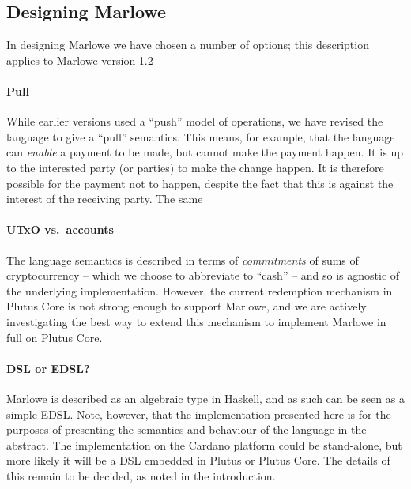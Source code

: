 \documentclass[
      acmsmall
    , screen
    , review=true
  ]{acmart}
\begin{document}
\subsection{Designing Marlowe}

In designing Marlowe we have chosen a number of options; this description applies to Marlowe version 1.2 

\paragraph{Pull} 

While earlier versions used a ``push'' model of operations, we have revised the language to give a ``pull'' semantics. This means, for example, that the language can \emph{enable} a payment to be made, but cannot make the payment happen. It is up to the interested party (or parties) to make the change happen. It is therefore possible for the payment not to happen, despite the fact that this is against the interest of the receiving party. The same 

\paragraph{UTxO vs.\ accounts} 

The language semantics is described in terms of \emph{commitments} of sums of cryptocurrency -- which we choose to abbreviate to ``cash'' -- and so is agnostic of the underlying implementation.  However, the current redemption mechanism in Plutus Core is not strong enough to support Marlowe, and we are actively investigating the best way to extend this mechanism to implement Marlowe in full on Plutus Core.

\paragraph{DSL or EDSL?}

Marlowe is described as an algebraic  type in Haskell, and as such can be seen as a simple EDSL. Note, however, that the implementation presented here is for the purposes of presenting the semantics and behaviour of the language in the abstract. The implementation on the Cardano platform could be stand-alone, but more likely it will be a DSL embedded in Plutus or Plutus Core. The details of this remain to be decided, as noted in the introduction.
\end{document}
